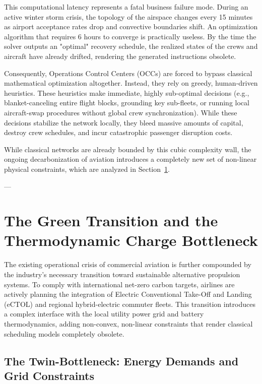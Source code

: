 \documentclass[11pt,a4paper]{book}
\begin{document}
This computational latency represents a fatal business failure mode. During an active winter storm crisis, the topology of the airspace changes every 15 minutes as airport acceptance rates drop and convective boundaries shift. An optimization algorithm that requires 6 hours to converge is practically useless. By the time the solver outputs an "optimal" recovery schedule, the realized states of the crews and aircraft have already drifted, rendering the generated instructions obsolete. 

Consequently, Operations Control Centers (OCCs) are forced to bypass classical mathematical optimization altogether. Instead, they rely on greedy, human-driven heuristics. These heuristics make immediate, highly sub-optimal decisions (e.g., blanket-canceling entire flight blocks, grounding key sub-fleets, or running local aircraft-swap procedures without global crew synchronization). While these decisions stabilize the network locally, they bleed massive amounts of capital, destroy crew schedules, and incur catastrophic passenger disruption costs.

While classical networks are already bounded by this cubic complexity wall, the ongoing decarbonization of aviation introduces a completely new set of non-linear physical constraints, which are analyzed in Section~\ref{sec:green_transition}.

---

\section{The Green Transition and the Thermodynamic Charge Bottleneck}\label{sec:green_transition}

The existing operational crisis of commercial aviation is further compounded by the industry's necessary transition toward sustainable alternative propulsion systems. To comply with international net-zero carbon targets, airlines are actively planning the integration of Electric Conventional Take-Off and Landing (eCTOL) and regional hybrid-electric commuter fleets. This transition introduces a complex interface with the local utility power grid and battery thermodynamics, adding non-convex, non-linear constraints that render classical scheduling models completely obsolete.

\subsection{The Twin-Bottleneck: Energy Demands and Grid Constraints}\label{sec:grid_constraints}
\end{document}
